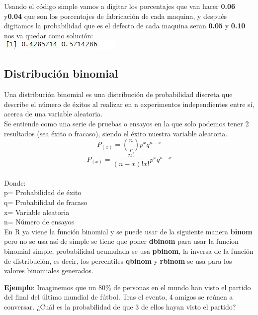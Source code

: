 \documentclass[12pt,hidelinks]{article}
\begin{document}
		Usando el código simple vamos a digitar los porcentajes que van hacer \textbf{0.06} y\textbf{0.04} que son los porcentajes de fabricación de cada maquina, y después digitamos la probabilidad que es el defecto de cada maquina seran \textbf{0.05} y \textbf{0.10}
		nos va quedar como solución:\\
		    \centering
            \includegraphics[scale=1]{Bayes.JPG}\\
            \centering
            \caption{}
            
            
	\subsection{Distribución binomial}
			Una distribución binomial es una distribución de probabilidad discreta que describe el número de éxitos al realizar en n experimentos independientes entre sí, acerca de una variable aleatoria.
			\\
			Se entiende como una serie de pruebas o
            ensayos en la que solo podemos tener 2
            resultados (sea éxito o fracaso), siendo el
            éxito nuestra variable aleatoria.
            \[P_{(x)}={n \choose r} p^{x}q^{n-x}\]
            \[P_{(x)}=\frac{n!}{(n-x)!x!}p^{x}q^{n-x}\]\\
            Donde:\\
            p= Probabilidad de éxito\\
            q= Probabilidad de fracaso\\
            x= Variable aleatoria\\
            n= Número de ensayos\\
            
            En R ya viene la función binomial y se puede usar de la siguiente manera \textbf{binom} pero no se usa así de simple se tiene que poner \textbf{dbinom} para usar la funcion binomial simple, probabilidad acumulada se usa \textbf{pbinom}, la inversa de la función de distribución, es decir, los percentiles \textbf{qbinom} y \textbf{rbinom} se usa para los valores binomiales generados.
            
            \textbf{Ejemplo}: Imaginemos que un 80\% de personas en el mundo han visto el partido  del final del último mundial de fútbol. Tras el evento, 4 amigos se reúnen a conversar. ¿Cuál es la probabilidad de que 3 de ellos hayan visto el partido?
            
\end{document}
